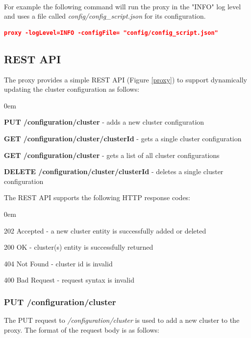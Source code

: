 \documentclass[a4paper,11pt,twoside]{article}
\begin{document}
\noindent\\
For example the following command will run the proxy in the "INFO" log level and uses a file called \textit{config/config\_script.json} for its configuration. 

\begin{lstlisting}[language=json]
proxy -logLevel=INFO -configFile= "config/config_script.json" 
\end{lstlisting}
 
\subsection{REST API}
The proxy provides a simple REST API (Figure \ref{proxy}) to support dynamically updating the cluster configuration as follows:

\begin{list}{-}{}
  \itemsep0em
  \item\textbf{{PUT /configuration/cluster}} - adds a new cluster configuration
  
  \item\textbf{{GET /configuration/cluster/{clusterId}}} -  gets a single cluster configuration
  
   \item\textbf{{GET /configuration/cluster}} - gets a list of all cluster configurations
   
   \item\textbf{{DELETE /configuration/cluster/{clusterId}}} -  deletes a single cluster configuration
  
\end{list}
\noindent
The REST API supports the following HTTP response codes:

\begin{list}{-}{}
  \itemsep0em
  \item{202 Accepted}  -  a new cluster entity is successfully added or deleted
  
  \item{200 OK} -  cluster(s) entity is successfully returned
  
   \item{404 Not Found} - cluster id is invalid
   
    \item{400 Bad Request } - request syntax is invalid
  
\end{list}

\subsubsection{PUT /configuration/cluster}\label{PUT}
The PUT request to \textit{/configuration/cluster}  is used to add a new cluster to the proxy. The format of the request body is as follows:\bigskip
\end{document}
